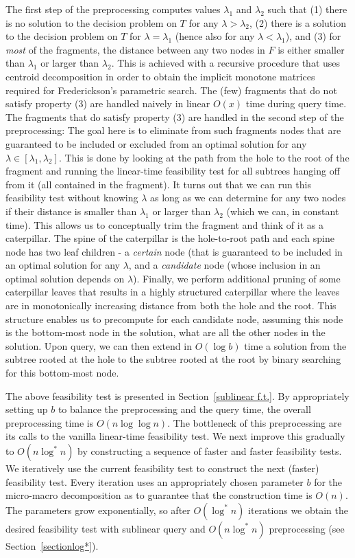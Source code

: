 \documentclass[11pt,a4paper]{article}
\theoremstyle{definition}
\theoremstyle{remark}
\begin{document}
The first step of the preprocessing computes values $\lambda_1$ and  $\lambda_2$ such that (1) there is no solution to the decision problem on $T$ for any $\lambda > \lambda_2$, (2) there is a solution to the decision problem on $T$ for $\lambda = \lambda_1$ (hence also for any $\lambda < \lambda_1$), and (3) for {\em most} of the fragments, the distance between any two nodes in $F$ is either smaller than $\lambda_1$ or larger than $\lambda_2$. This is achieved with a recursive procedure that uses centroid decomposition in order to obtain the implicit monotone matrices required for Frederickson's parametric search. The (few) fragments that do not satisfy property (3) are handled naively in linear $O(x)$ time during query time. The fragments that do satisfy property (3) are handled in the second step of the preprocessing: The goal here is to eliminate from such fragments nodes that are guaranteed to be included or excluded from an optimal solution for any $\lambda \in [\lambda_1,\lambda_2]$. This is done by looking at the path from the hole to the root of the fragment and running the linear-time feasibility test for all subtrees hanging off from it (all contained in the fragment). It turns out that we can run this feasibility test without knowing $\lambda$ as long as we can determine for any two nodes if their distance is smaller than $\lambda_1$ or larger than $\lambda_2$ (which we can, in constant time). This allows us to conceptually trim the fragment and think of it as a caterpillar. The spine of the caterpillar is the hole-to-root path and each spine node has two leaf children - a \emph{certain} node (that is guaranteed to be included in an optimal solution for any $\lambda$, and a \emph{candidate} node (whose inclusion in an optimal solution depends on $\lambda$). Finally, we perform additional pruning of some caterpillar leaves that results in a highly structured caterpillar where the leaves are in monotonically increasing distance from both the hole and the root. This structure enables us to precompute for each candidate node, assuming this node is the bottom-most node in the solution, what are all the other nodes in the solution. Upon query, we can then extend in $O(\log b)$ time a solution from the subtree rooted at the hole to the subtree rooted at the root by  binary searching for this bottom-most node. 

The above feasibility test is presented in Section~\ref{sublinear f.t.}. By appropriately setting up $b$ to balance the preprocessing and the query time, the overall preprocessing time is $O(n\log\log n)$. The bottleneck of this preprocessing are its calls to the vanilla linear-time feasibility test.  
We next improve this gradually to $O(n\log^* n)$ by constructing a sequence of faster and faster feasibility tests. 
We iteratively use the current feasibility test to construct the next (faster) feasibility test.
Every iteration uses an appropriately chosen parameter $b$ for the micro-macro decomposition
as to guarantee that the construction time is $O(n)$. The parameters grow exponentially,
so after $O(\log^{*}n)$ iterations we obtain the desired  feasibility test with sublinear query and $O(n\log^* n)$ preprocessing (see Section~\ref{sectionlog*}). 
\end{document}
